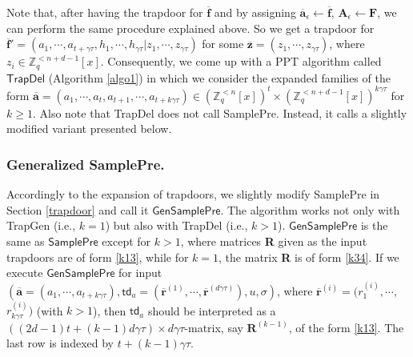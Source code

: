 \documentclass[runningheads]{llncs}
\begin{document}
    
    
 Note that, after having the trapdoor for $\overline{\mathbf{f}}$ and by assigning 
 $\overline{\mathbf{a}}_{\epsilon}\leftarrow \overline{\mathbf{f}}$, 
 $\textbf{A}_{\epsilon} \leftarrow \textbf{F}$, 
 we can perform the same procedure explained above.
So we get a trapdoor for $\overline{\mathbf{f}}'=(a_1,\cdots,a_{t+\gamma \tau}, h_1,\cdots, h_{\gamma \tau}|z_1,\cdots, z_{\gamma \tau} )$ for some $\overline{\mathbf{z}}=(z_1,\cdots, z_{\gamma \tau})$, where $z_i\in \mathbb{Z}^{<n+d-1}_q[x]$.  
Consequently, 
we come up with a PPT algorithm called $\mathsf{TrapDel}$
(Algorithm \ref{algo1}) in which we consider the expanded families of the 
form $\overline{\mathbf{a}}=(a_1,\cdots,a_t,a_{t+1},\cdots,a_{t+k\gamma \tau}) \in (\mathbb{Z}_q^{<n}[x])^t \times (\mathbb{Z}_q^{<n+d-1}[x])^{k\gamma \tau}$ for $k \geq 1$. 
Also note that \textsf{TrapDel} does not call \textsf{SamplePre}.
Instead, it calls a slightly modified variant presented below.


\subsubsection{   Generalized \textsf{SamplePre}. }     
Accordingly to the expansion of trapdoors, 
we slightly modify \textsf{SamplePre} in Section \ref{trapdoor}
and call it $\mathsf{GenSamplePre}$.
The algorithm works not only with \textsf{TrapGen} 
(i.e., $k=1$) but also with \textsf{TrapDel} (i.e., $k>1$). 
$\mathsf{GenSamplePre}$ is the same as $\mathsf{SamplePre}$ 
except for $k>1$, where matrices  
\textbf{R} given as the input trapdoors are of form \eqref{k13}, 
while for $k=1$, the matrix \textbf{R} is of form \eqref{k34}. 
If we execute    
$\mathsf{GenSamplePre}$ for  input $(\overline{\mathbf{a}}=(a_1, \cdots, a_{t+k\gamma\tau}),\mathsf{td}_a=(\overline{\mathbf{r}}^{(1)}, \cdots, \overline{\mathbf{r}}^{({d\gamma \tau})}),u,\sigma)$, where $\overline{\mathbf{r}}^{(i)}=(r^{(i)}_1, \cdots,$ $ r^{(i)}_{k\gamma\tau})$ (with $k>1$),
 then $\mathsf{td}_a$ should be interpreted as a ${((2d-1)t+(k-1)d\gamma \tau) \times d\gamma \tau}$-matrix, say $ \textbf{R}^{(k-1)}$, of the form \eqref{k13}.
The last row is indexed by $t+(k-1)\gamma \tau$.


\iffalse
\end{document}
